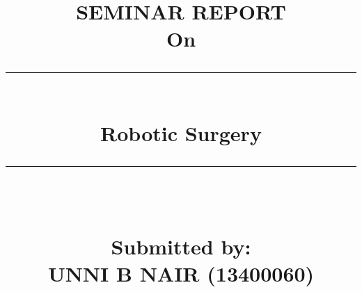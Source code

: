 %
%
%
% 
%
%

\documentclass[23pt]{article}
\usepackage[margin=1in, paperwidth=21cm, paperheight=29.7cm]{geometry}
\usepackage[pdftex]{color,graphicx}
\usepackage[english]{babel}
\usepackage[utf8x]{inputenc}
\usepackage{amsmath}
\usepackage[colorinlistoftodos]{todonotes}
\usepackage{cite}
\usepackage{listings}
\usepackage[nodayofweek]{datetime}
\usepackage{setspace}
\usepackage{fancyhdr}
\newcommand{\HRule}{\rule{\linewidth}{0.5mm}}

\nocite{*}
\title{\begin{center}
\bf SEMINAR REPORT\\
\vspace{0.5cm} On\\
\HRule \\[0.4cm]
{ \huge \bfseries Robotic Surgery}\\[0.4cm] %
\HRule \\[0.4 cm]
\vspace{0.5cm} \begin{Large} Submitted by:\\ 
\vspace{.35cm}UNNI B NAIR (13400060)
\end{Large}
\end{center}}
\vspace{.5cm}
\date{}

